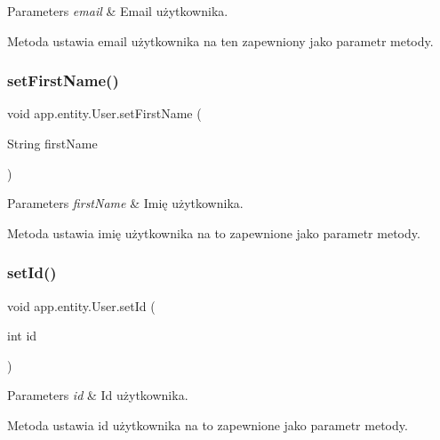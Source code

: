 \begin{DoxyParams}{Parameters}
{\em email} & Email użytkownika.\\
\hline
\end{DoxyParams}
Metoda ustawia email użytkownika na ten zapewniony jako parametr metody. \mbox{\label{classapp_1_1entity_1_1_user_a0ba9ca1e71cfcfdc6139b9fe102ced5d}} 
\subsubsection{\texorpdfstring{setFirstName()}{setFirstName()}}
{\footnotesize\ttfamily void app.\+entity.\+User.\+set\+First\+Name (\begin{DoxyParamCaption}\item[{String}]{first\+Name }\end{DoxyParamCaption})}


\begin{DoxyParams}{Parameters}
{\em first\+Name} & Imię użytkownika.\\
\hline
\end{DoxyParams}
Metoda ustawia imię użytkownika na to zapewnione jako parametr metody. \mbox{\label{classapp_1_1entity_1_1_user_a4a8c0d9f2b5e71c358252968d1cc6e50}} 
\subsubsection{\texorpdfstring{setId()}{setId()}}
{\footnotesize\ttfamily void app.\+entity.\+User.\+set\+Id (\begin{DoxyParamCaption}\item[{int}]{id }\end{DoxyParamCaption})}


\begin{DoxyParams}{Parameters}
{\em id} & Id użytkownika.\\
\hline
\end{DoxyParams}
Metoda ustawia id użytkownika na to zapewnione jako parametr metody. \mbox{\label{classapp_1_1entity_1_1_user_a4ebc3f3fc0d5c63bd337764ce94f319a}} 
